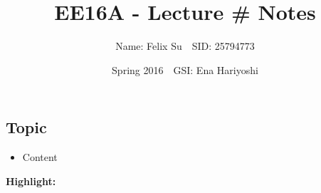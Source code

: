 \documentclass{article}\usepackage{amsmath,amssymb,amsthm,tikz,tkz-graph,color,chngpage,soul,hyperref,csquotes,graphicx,floatrow}\newcommand*{\QEDB}{\hfill\ensuremath{\square}}\newtheorem*{prop}{Proposition}\renewcommand{\theenumi}{\alph{enumi}}\usepackage[shortlabels]{enumitem}\usepackage[nobreak=true]{mdframed}\usetikzlibrary{matrix,calc}\MakeOuterQuote{"}\usepackage[margin=0.75in]{geometry} \newtheorem{theorem}{Theorem}\newcommand{\Z}{\mathbb Z}\newcommand{\R}{\mathbb R}\newcommand{\Q}{\mathbb Q}\newcommand{\N}{\mathbb N}\newcommand{\x}[1]{\textrm{ #1 }}\newcommand{\pr}{\textrm{Pr}}
\title{EE16A - Lecture # Notes}
\author{Name: Felix Su$\quad$SID: 25794773}
\date{Spring 2016$\quad$GSI: Ena Hariyoshi}
\begin{document}
\maketitle

\subsection*{Topic}
\begin{itemize}
    \item Content
\end{itemize}
\begin{mdframed}
\textbf{Highlight:}\\
\end{mdframed}
\end{document}
